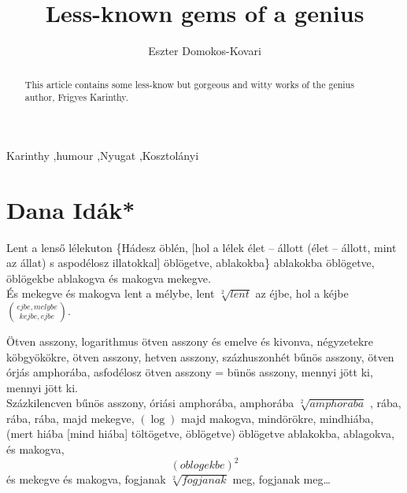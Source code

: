\documentclass[3p,times]{elsarticle}
\begin{document}
\begin{frontmatter}





\title{Less-known gems of a genius}



\author{Eszter Domokos-Kovari}

\address{University of Sopron - PhD student}

\begin{abstract}
This article contains some less-know but gorgeous and witty works of the genius author, Frigyes Karinthy.
\end{abstract}

\begin{keyword}
Karinthy \sep humour \sep Nyugat \sep Kosztolányi



\end{keyword}

\end{frontmatter}


\section{Dana Idák*}
\label{}

Lent a lenső lélekuton \{Hádesz öblén, [hol a lélek élet – állott (élet – állott, mint az állat) s aspodélosz illatokkal] öblögetve, ablakokba\} ablakokba öblögetve, öblögekbe ablakogva és makogva mekegve.\\


És mekegve és makogva lent a mélybe, lent $ \sqrt[2]{lent}  $ az éjbe, hol a kéjbe $ {ejbe,melybe \choose   kejbe,ejbe} $.

Ötven asszony, logarithmus ötven asszony és emelve és kivonva, négyzetekre köbgyökökre, ötven asszony, hetven asszony, százhuszonhét bűnös asszony, ötven órjás amphorába, asfodélosz ötven asszony = bünös asszony, mennyi jött ki, mennyi jött ki.\\
Százkilencven bűnös asszony, óriási amphorába, amphorába \begin{math} \sqrt[2]{amphoraba} \end{math} , rába, rába, rába, majd mekegve, $(\log) $ majd makogva, mindörökre, mindhiába, (mert hiába [mind hiába] töltögetve, öblögetve) öblögetve ablakokba, ablagokva, és makogva,\begin{displaymath} (oblogekbe)^{2} \end{displaymath} és mekegve és makogva, fogjanak $ \sqrt[2]{fogjanak} $ meg, fogjanak meg…\\
\end{document}
